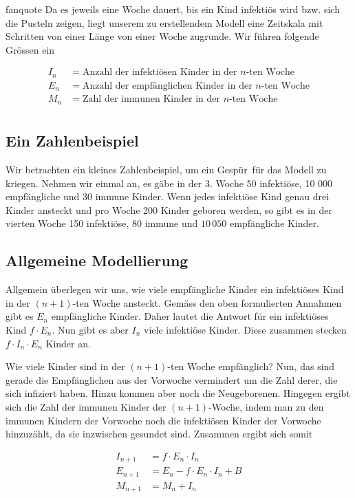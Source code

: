 \documentclass[%
<<<<<<< Updated upstream
<<<<<<< Updated upstream
11pt,%
twoside,%
titlepage,%
german,%
headsepline%
]{scrartcl}
\begin{document}
\begin{uebenv}{fanquote}
Da es jeweils eine Woche dauert, bis ein Kind infektiös wird bzw. sich die Pusteln zeigen, liegt unserem zu erstellendem Modell eine Zeitskala mit Schritten von einer Länge von einer Woche zugrunde. Wir führen folgende Grössen ein

\begin{align*}
I_n &= \text{Anzahl der infektiösen Kinder in der $n$-ten Woche}\\
E_n &= \text{Anzahl der empfänglichen Kinder in der $n$-ten Woche}\\
M_n &= \text{Zahl der immunen Kinder in der $n$-ten Woche}\\
\end{align*}

\subsection*{Ein Zahlenbeispiel}

Wir betrachten ein kleines Zahlenbeispiel, um ein \glqq Gespür\grqq\ für das Modell zu kriegen. Nehmen wir einmal an, es gäbe in der 3. Woche 50 infektiöse, 10 000 empfängliche und 30 immune Kinder. Wenn jedes infektiöse Kind genau drei Kinder ansteckt und pro Woche 200 Kinder geboren werden, so gibt es in der vierten Woche 150 infektiöse, 80 immune und $10\,050$ empfängliche Kinder.

\subsection{Allgemeine Modellierung}

Allgemein überlegen wir uns, wie viele empfängliche Kinder ein infektiöses Kind in der $(n+ 1)$-ten Woche ansteckt. Gemäss den oben formulierten Annahmen gibt es $E_n$ empfängliche Kinder. Daher lautet die Antwort für ein infektiöses Kind $f\cdot E_n$. Nun gibt es aber $I_n$ viele infektiöse Kinder. Diese zusammen stecken $f\cdot I_n\cdot E_n$ Kinder an.

Wie viele Kinder sind in der $(n+1)$-ten Woche empfänglich? Nun, das sind gerade die Empfänglichen aus der Vorwoche vermindert um die Zahl derer, die sich infiziert haben. Hinzu kommen aber noch die Neugeborenen. Hingegen ergibt sich die Zahl der immunen Kinder der $(n+1)$-Woche, indem man zu den immunen Kindern der Vorwoche noch die infektiösen Kinder der Vorwoche hinzuzählt, da sie inzwischen gesundet sind. Zusammen ergibt sich somit

\begin{align*}
I_{n+1} &= f\cdot E_n\cdot I_n\\
E_{n+1} &= E_n-f\cdot E_n\cdot I_n+B\\
M_{n+1} &= M_n+I_n
\end{align*}


\end{uebenv}
\end{document}
